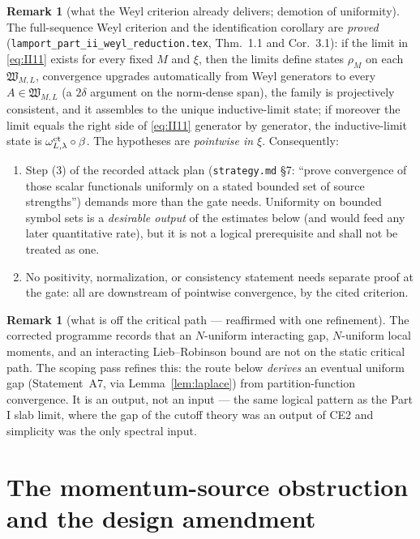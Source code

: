 \documentclass[11pt,a4paper]{article}
\theoremstyle{plain}
\theoremstyle{definition}
\newtheorem{remark}[theorem]{Remark}
\newcommand{\W}{\mathfrak{W}}
\begin{document}
\begin{remark}[what the Weyl criterion already delivers; demotion of uniformity]
\label{rem:pointwise}
The full-sequence Weyl criterion and the identification corollary are \emph{proved}
(\texttt{lamport\_part\_ii\_}\allowbreak\texttt{weyl\_reduction.tex},
Thm.~1.1 and Cor.~3.1): if the limit
in \eqref{eq:II11} exists for every fixed $M$ and $\xi$, then the limits define states
$\rho_M$ on each $\W_{M,L}$, convergence upgrades automatically from Weyl generators to
every $A\in\W_{M,L}$ (a $2\delta$ argument on the norm-dense span), the family is
projectively consistent, and it assembles to the unique inductive-limit state; if
moreover the limit equals the right side of \eqref{eq:II11} generator by generator,
the inductive-limit state is $\omega^{\rm ct}_{L,\lambda}\circ\beta$. The hypotheses
are \emph{pointwise in $\xi$}. Consequently:
\begin{enumerate}
\item Step (3) of the recorded attack plan (\texttt{strategy.md} \S7: ``prove
convergence of those scalar functionals uniformly on a stated bounded set of source
strengths'') demands more than the gate needs. Uniformity on bounded symbol sets is a
\emph{desirable output} of the estimates below (and would feed any later quantitative
rate), but it is not a logical prerequisite and shall not be treated as one.
\item No positivity, normalization, or consistency statement needs separate proof at
the gate: all are downstream of pointwise convergence, by the cited criterion.
\end{enumerate}
\end{remark}

\begin{remark}[what is off the critical path --- reaffirmed with one refinement]
\label{rem:offpath}
The corrected programme records that an $N$-uniform interacting gap, $N$-uniform local
moments, and an interacting Lieb--Robinson bound are not on the static critical path.
The scoping pass refines this: the route below \emph{derives} an eventual uniform gap
(Statement~A7, via Lemma~\ref{lem:laplace}) from partition-function convergence. It is
an output, not an input --- the same logical pattern as the Part I slab limit, where
the gap of the cutoff theory was an output of CE2 and simplicity was the only
spectral input.
\end{remark}

\section{The momentum-source obstruction and the design amendment}
\label{sec:obstruction}
\end{document}
